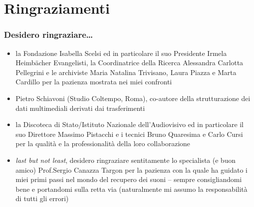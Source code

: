 \documentclass[compress,xcolor=dvipsnames]{beamer}
\newcommand{\FIS}{Fondazione Isabella Scelsi\xspace}
\begin{document}
\section{Ringraziamenti}

\begin{frame}
    \frametitle{Desidero ringraziare\dots}

	  \begin{itemize}%

	    \item la \FIS ed in particolare il suo Presidente Irmela Heimb\"acher Evangelisti,
	          la Coordinatrice della Ricerca Alessandra Carlotta Pellegrini e le
            archiviste Maria Natalina Trivisano, Laura Piazza e Marta Cardillo
	          per la pazienza mostrata nei miei confronti
	
	    \item Pietro Schiavoni (Studio Coltempo, Roma), co-autore
	        della strutturazione dei dati multimediali derivati dai trasferimenti
	
	    \item la Discoteca di Stato/Istituto
	        Nazionale dell'Audiovisivo ed in particolare il suo Direttore Massimo
	        Pistacchi e i tecnici Bruno Quaresima e Carlo Cursi per la
	        qualit\`a e la professionalit\`a della loro collaborazione
	
	    \item \emph{last but not least}, desidero ringraziare sentitamente lo specialista (e buon
	        amico) Prof.Sergio Canazza Targon per la pazienza con la quale ha
	        guidato i miei primi passi nel mondo del recupero dei suoni -- sempre
	        consigliandomi bene e portandomi sulla retta via
          (naturalmente mi assumo la responsabilit\`a
          di tutti gli errori)

	  \end{itemize}

\end{frame}
\end{document}
